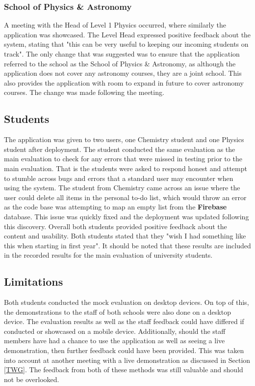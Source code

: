 \documentclass{l4proj}
\begin{document}
\subsubsection{School of Physics \& Astronomy}
A meeting with the Head of Level 1 Physics occurred,  where similarly the application was showcased. The Level Head expressed positive feedback about the system,  stating that "this can be very useful to keeping our incoming students on track". The only change that was suggested was to ensure that the application referred to the school as the School of Physics \& Astronomy,  as although the application does not cover any astronomy courses,  they are a joint school. This also provides the application with room to expand in future to cover astronomy courses. The change was made following the meeting.

\subsection{Students}
The application was given to two users,  one Chemistry student and one Physics student after deployment. The student conducted the same evaluation as the main evaluation to check for any errors that were missed in testing prior to the main evaluation. That is the students were asked to respond honest and attempt to stumble across bugs and errors that a standard user may encounter when using the system. The student from Chemistry came across an issue where the user could delete all items in the personal to-do list,  which would throw an error as the code base was attempting to map an empty list from the \textbf{Firebase} database. This issue was quickly fixed and the deployment was updated following this discovery. Overall both students provided positive feedback about the content and usability. Both students stated that they "wish I had something like this when starting in first year". It should be noted that these results are included in the recorded results for the main evaluation of university students.

\subsection{Limitations}
Both students conducted the mock evaluation on desktop devices. On top of this,  the demonstrations to the staff of both schools were also done on a desktop device. The evaluation results as well as the staff feedback could have differed if conducted or showcased on a mobile device. Additionally,  should the staff members have had a chance to use the application as well as seeing a live demonstration,  then further feedback could have been provided. This was taken into account at another meeting with a live demonstration as discussed in Section \ref{TWG}. The feedback from both of these methods was still valuable and should not be overlooked.
\end{document}
